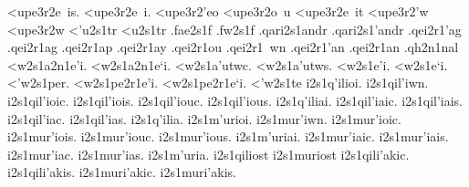{	<upe3r2e~is.
	<upe3r2e~i.
	<upe3r2'eo
	<upe3r2o~u
	<upe3r2e~it
	<upe3r2'w 		%
	<upe3r2w 		%
<'u2s1tr 		%
<u2s1tr 		%
.fae2s1f 		%
.fw2s1f  		%
.qari2s1andr 		%
.qari2s1'andr
.qei2r1'ag 		%
.qei2r1ag  		%
.qei2r1ap  		%
.qei2r1ay		%
.qei2r1ou  		%
.qei2r1~wn 		%
.qei2r1'an
.qei2r1an
.qh2n1nal		%
<w2s1a2n1e'i. 		%
<w2s1a2n1e`i.
<w2s1a'utwc.  		%
<w2s1a'utws.
<w2s1e'i.  		%
<w2s1e`i.
<'w2s1per.		%
<w2s1pe2r1e'i. 		%
<w2s1pe2r1e`i.
<'w2s1te  		%
i2s1q'ilioi.  		%
i2s1qil'iwn.
i2s1qil'ioic.
i2s1qil'iois.
i2s1qil'iouc.
i2s1qil'ious.
i2s1q'iliai.
i2s1qil'iaic.
i2s1qil'iais.
i2s1qil'iac.
i2s1qil'ias.
i2s1q'ilia.
%
i2s1m'urioi. 		%
i2s1mur'iwn.
i2s1mur'ioic.
i2s1mur'iois.
i2s1mur'iouc.
i2s1mur'ious.
i2s1m'uriai.
i2s1mur'iaic.
i2s1mur'iais.
i2s1mur'iac.
i2s1mur'ias.
i2s1m'uria.
%
i2s1qiliost  		%
%
i2s1muriost 		%
%
i2s1qili'akic. 		%
i2s1qili'akis.
%
i2s1muri'akic. 		%
i2s1muri'akis.
} %
\endgroup
\endinput
